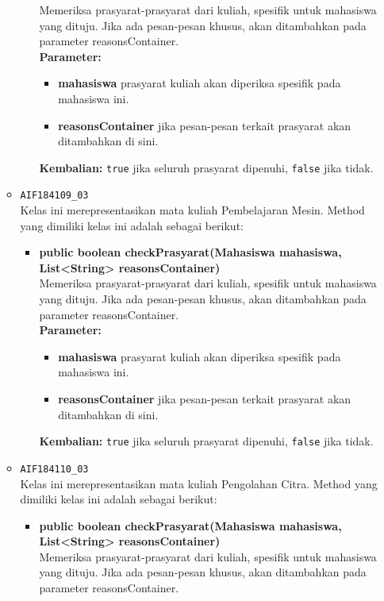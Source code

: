 \begin{enumerate}
\begin{itemize}
\begin{itemize}
			Memeriksa prasyarat-prasyarat dari kuliah, spesifik untuk mahasiswa yang dituju. Jika ada pesan-pesan khusus, akan ditambahkan pada parameter reasonsContainer.\\
			\textbf{Parameter:}
			\begin{itemize}
				\item \textbf{mahasiswa} prasyarat kuliah akan diperiksa spesifik pada mahasiswa ini.
				\item \textbf{reasonsContainer} jika pesan-pesan terkait prasyarat akan ditambahkan di sini.
			\end{itemize}
			\textbf{Kembalian:} \texttt{true} jika seluruh prasyarat dipenuhi, \texttt{false} jika tidak.
		\end{itemize}
		\item \texttt{AIF184109\_03} \\
		Kelas ini merepresentasikan mata kuliah Pembelajaran Mesin. Method yang dimiliki kelas ini adalah sebagai berikut: 
		\begin{itemize}
			\item \textbf{public boolean checkPrasyarat(Mahasiswa mahasiswa, List<String> reasonsContainer)}\\
			Memeriksa prasyarat-prasyarat dari kuliah, spesifik untuk mahasiswa yang dituju. Jika ada pesan-pesan khusus, akan ditambahkan pada parameter reasonsContainer.\\
			\textbf{Parameter:}
			\begin{itemize}
				\item \textbf{mahasiswa} prasyarat kuliah akan diperiksa spesifik pada mahasiswa ini.
				\item \textbf{reasonsContainer} jika pesan-pesan terkait prasyarat akan ditambahkan di sini.
			\end{itemize}
			\textbf{Kembalian:} \texttt{true} jika seluruh prasyarat dipenuhi, \texttt{false} jika tidak.
		\end{itemize}
		\item \texttt{AIF184110\_03} \\
		Kelas ini merepresentasikan mata kuliah Pengolahan Citra. Method yang dimiliki kelas ini adalah sebagai berikut: 
		\begin{itemize}
			\item \textbf{public boolean checkPrasyarat(Mahasiswa mahasiswa, List<String> reasonsContainer)}\\
			Memeriksa prasyarat-prasyarat dari kuliah, spesifik untuk mahasiswa yang dituju. Jika ada pesan-pesan khusus, akan ditambahkan pada parameter reasonsContainer.\\

\end{itemize}
\end{itemize}
\end{enumerate}

